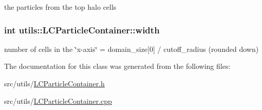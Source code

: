 the particles from the top halo cells \hypertarget{classutils_1_1LCParticleContainer_a8f0d10a0d6fb422670bc587238ef6662}{
\subsubsection[{width}]{\setlength{\rightskip}{0pt plus 5cm}int utils\-::\-L\-C\-Particle\-Container\-::width\hspace{0.3cm}{\ttfamily [private]}}}\label{classutils_1_1LCParticleContainer_a8f0d10a0d6fb422670bc587238ef6662}
number of cells in the \char`\"{}x-\/axis\char`\"{} = domain\-\_\-size\mbox{[}0\mbox{]} / cutoff\-\_\-radius (rounded down) 

The documentation for this class was generated from the following files\-:\begin{DoxyCompactItemize}
\item 
src/utils/\hyperlink{LCParticleContainer_8h}{L\-C\-Particle\-Container.\-h}\item 
src/utils/\hyperlink{LCParticleContainer_8cpp}{L\-C\-Particle\-Container.\-cpp}\end{DoxyCompactItemize}
